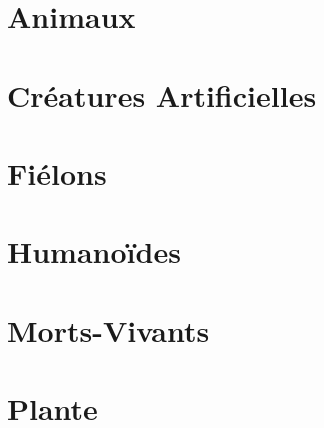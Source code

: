 \documentclass{dd}
\begin{document}
\section{Animaux}



\section{Créatures Artificielles}









\section{Fiélons}










\section{Humanoïdes}











\section{Morts-Vivants}









\section{Plante}

\end{document}
